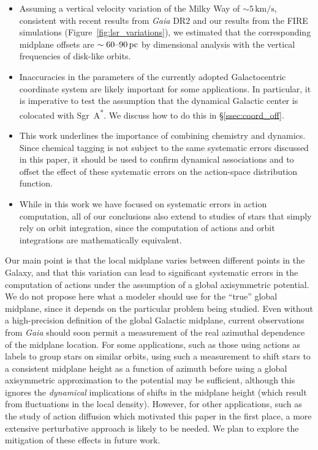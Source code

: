 \documentclass[twocolumn]{aastex62}
\newcommand{\pc}{\text{pc}}
\newcommand{\kms}{\text{km}/\text{s}}
\newcommand{\sgra}{Sgr~A\textsuperscript{*}}
\begin{document}
\begin{itemize}
\item Assuming a vertical velocity variation of the Milky Way of
$\sim5\,\kms$, consistent with recent results from \textit{Gaia} DR2
\citep{2018A&A...616A..11G, 2019arXiv190209569F} and our results from the FIRE
simulations (Figure~\ref{fig:lsr_variations}), we estimated that the
corresponding midplane offsets are $\sim60\textup{--}90\,\pc$ by dimensional
analysis with the vertical frequencies of disk-like orbits.

\item Inaccuracies in the parameters of the currently adopted
Galactocentric coordinate system are likely important for some
applications. In particular, it is imperative to test the assumption that the
dynamical Galactic center is colocated with \sgra{}. We discuss how to
do this in \S \ref{ssec:coord_off}.

\item This work underlines the importance of combining chemistry and dynamics.
Since chemical tagging \citep{2002ARA&A..40..487F} is not subject to the same systematic errors discussed in this paper, it should be used to confirm dynamical associations and to offset the effect of these systematic errors on the action-space distribution function. %

\item While in this work we have focused on systematic errors in action
computation, all of our conclusions also extend to studies of stars that
simply rely on orbit integration, since the computation of actions and orbit
integrations are mathematically equivalent.

\end{itemize}

Our main point is that the local midplane varies between different points in
the Galaxy, and that this variation can lead to significant systematic errors
in the computation of actions under the assumption of a global axisymmetric
potential. We do not propose here what a modeler should use for the ``true''
global midplane, since it depends on the particular problem being studied.
Even without a high-precision definition of the global Galactic midplane,
current observations from \textit{Gaia} should soon permit a measurement of the
real azimuthal dependence of the midplane location. For some applications,
such as those using actions as labels to group stars on similar orbits, using
such a measurement to shift stars to a consistent midplane height as a
function of azimuth before using a global axisymmetric approximation to the
potential may be sufficient, although this ignores the \emph{dynamical}
implications of shifts in the midplane height (which result from fluctuations
in the local density). However, for other applications, such as the study of
action diffusion which motivated this paper in the first place, a more
extensive perturbative approach is likely to be needed. We plan to explore the
mitigation of these effects in future work.
\end{document}
